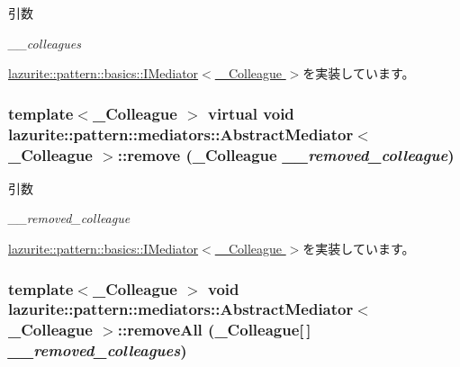 \begin{DoxyParams}{引数}
\item[{\em \_\-\_\-colleagues}]\end{DoxyParams}


\hyperlink{interfacelazurite_1_1pattern_1_1basics_1_1_i_mediator_3_01___colleague_01_4_ae4d319025b48060df543d4d3c654bfb5}{lazurite::pattern::basics::IMediator$<$ \_\-Colleague $>$}を実装しています。\hypertarget{classlazurite_1_1pattern_1_1mediators_1_1_abstract_mediator_3_01___colleague_01_4_a601e9d6ee36d72f455ebc9c95e7b0000}{
\subsubsection[{remove}]{\setlength{\rightskip}{0pt plus 5cm}template$<$\_\-Colleague $>$ virtual void lazurite::pattern::mediators::AbstractMediator$<$ \_\-Colleague $>$::remove (\_\-Colleague {\em \_\-\_\-removed\_\-colleague})}}
\label{classlazurite_1_1pattern_1_1mediators_1_1_abstract_mediator_3_01___colleague_01_4_a601e9d6ee36d72f455ebc9c95e7b0000}

\begin{DoxyParams}{引数}
\item[{\em \_\-\_\-removed\_\-colleague}]\end{DoxyParams}


\hyperlink{interfacelazurite_1_1pattern_1_1basics_1_1_i_mediator_3_01___colleague_01_4_aaeaaca17d4e64f068539fb68f5049f4a}{lazurite::pattern::basics::IMediator$<$ \_\-Colleague $>$}を実装しています。\hypertarget{classlazurite_1_1pattern_1_1mediators_1_1_abstract_mediator_3_01___colleague_01_4_aa15986b46e385754fe1a8fdde417e63c}{
\subsubsection[{removeAll}]{\setlength{\rightskip}{0pt plus 5cm}template$<$\_\-Colleague $>$ void lazurite::pattern::mediators::AbstractMediator$<$ \_\-Colleague $>$::removeAll (\_\-Colleague\mbox{[}$\,$\mbox{]} {\em \_\-\_\-removed\_\-colleagues})}}
\label{classlazurite_1_1pattern_1_1mediators_1_1_abstract_mediator_3_01___colleague_01_4_aa15986b46e385754fe1a8fdde417e63c}

